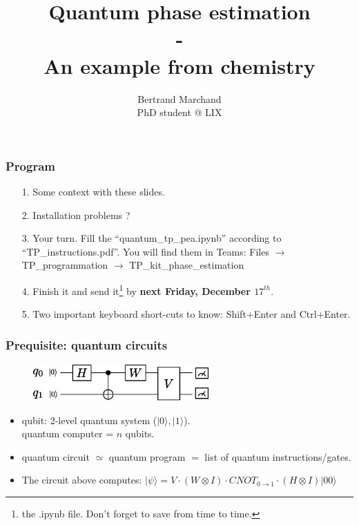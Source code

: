\documentclass{beamer}
\title{Quantum phase estimation \\-\\ An example from chemistry}
\author{Bertrand Marchand \\PhD student @ LIX}
\begin{document}
\frame{\titlepage}

\begin{frame}
\frametitle{Program}

\begin{itemize}
\item[1.] Some context with these slides.
\item[2.] Installation problems ?
\item[3.] Your turn. Fill the ``quantum\_tp\_pea.ipynb'' according to ``TP\_instructions.pdf''. You will find them in Teams: Files $\rightarrow$ 
TP\_programmation $\rightarrow$ TP\_kit\_phase\_estimation 
\item[4.] Finish it and send it\footnote{the .ipynb file. Don't forget to save from time to time.} 
    by \textbf{next Friday, December $17^{th}$}.
\item[5.] Two important keyboard short-cuts to know: Shift+Enter and Ctrl+Enter.
\end{itemize}

\end{frame}

\begin{frame}
\frametitle{Prequisite: quantum circuits}

\begin{center}
\begin{figure}
\includegraphics[width=0.6\textwidth]{quantum_circuit_example.eps}
\end{figure}
\end{center}
\begin{itemize}
\item qubit: 2-level quantum system ($|0\rangle, |1\rangle$). \\ quantum computer = $n$ qubits.
\item quantum circuit $\simeq$ quantum program $=$ list of quantum instructions/gates.
\item The circuit above computes: $|\psi\rangle = V \cdot (W\otimes I) \cdot CNOT_{0\rightarrow 1} \cdot (H\otimes I) |00\rangle$
\end{itemize}

 
\end{frame}
\end{document}
